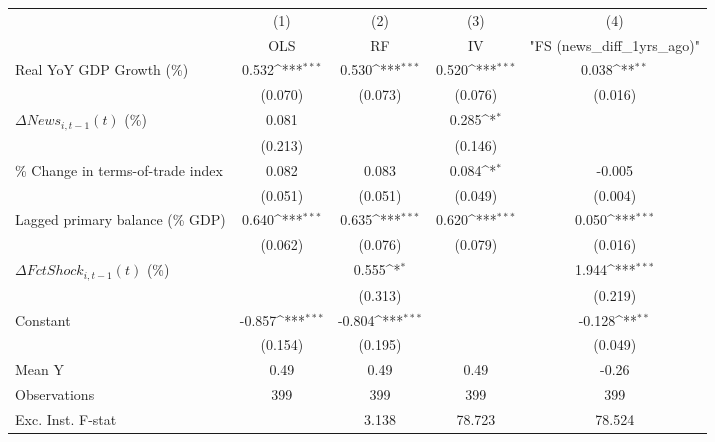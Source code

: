 {
\def\sym#1{\ifmmode^{#1}\else\(^{#1}\)\fi}
\begin{tabular}{l*{4}{c}}
\toprule
                    &\multicolumn{1}{c}{(1)}&\multicolumn{1}{c}{(2)}&\multicolumn{1}{c}{(3)}&\multicolumn{1}{c}{(4)}\\
                    &\multicolumn{1}{c}{OLS}&\multicolumn{1}{c}{RF}&\multicolumn{1}{c}{IV}&\multicolumn{1}{c}{ "FS (news_diff_1yrs_ago)" }\\
\midrule
Real YoY GDP Growth (\%)&       0.532\sym{***}&       0.530\sym{***}&       0.520\sym{***}&       0.038\sym{**} \\
                    &     (0.070)         &     (0.073)         &     (0.076)         &     (0.016)         \\
\addlinespace
$ \Delta News_{i,t-1}(t)$ (\%)&       0.081         &                     &       0.285\sym{*}  &                     \\
                    &     (0.213)         &                     &     (0.146)         &                     \\
\addlinespace
\% Change in terms-of-trade index&       0.082         &       0.083         &       0.084\sym{*}  &      -0.005         \\
                    &     (0.051)         &     (0.051)         &     (0.049)         &     (0.004)         \\
\addlinespace
Lagged primary balance (\% GDP)&       0.640\sym{***}&       0.635\sym{***}&       0.620\sym{***}&       0.050\sym{***}\\
                    &     (0.062)         &     (0.076)         &     (0.079)         &     (0.016)         \\
\addlinespace
$ \Delta FctShock_{i,t-1}(t)$ (\%)&                     &       0.555\sym{*}  &                     &       1.944\sym{***}\\
                    &                     &     (0.313)         &                     &     (0.219)         \\
\addlinespace
Constant            &      -0.857\sym{***}&      -0.804\sym{***}&                     &      -0.128\sym{**} \\
                    &     (0.154)         &     (0.195)         &                     &     (0.049)         \\
\midrule
Mean Y              &        0.49         &        0.49         &        0.49         &       -0.26         \\
Observations        &         399         &         399         &         399         &         399         \\
Exc. Inst. F-stat   &                     &       3.138         &      78.723         &      78.524         \\
\bottomrule
\end{tabular}
}
